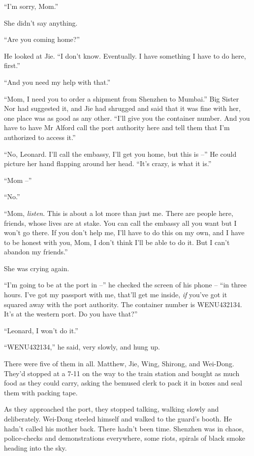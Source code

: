 ``I'm sorry, Mom.''

She didn't say anything.

``Are you coming home?''

He looked at Jie. ``I don't know. Eventually. I have something I
have to do here, first.''

``And you need my help with that.''

``Mom, I need you to order a shipment from Shenzhen to Mumbai.'' Big
Sister Nor had suggested it, and Jie had shrugged and said that it
was fine with her, one place was as good as any other. ``I'll give
you the container number. And you have to have Mr Alford call the
port authority here and tell them that I'm authorized to access
it.''

``No, Leonard. I'll call the embassy, I'll get you home, but this is
--'' He could picture her hand flapping around her head. ``It's
crazy, is what it is.''

``Mom --''

``No.''

``Mom, \emph{listen}. This is about a lot more than just me. There
are people here, friends, whose lives are at stake. You can call
the embassy all you want but I won't go there. If you don't help
me, I'll have to do this on my own, and I have to be honest with
you, Mom, I don't think I'll be able to do it. But I can't abandon
my friends.''

She was crying again.

``I'm going to be at the port in --'' he checked the screen of his
phone -- ``in three hours. I've got my passport with me, that'll get
me inside, \emph{if} you've got it squared away with the port
authority. The container number is WENU432134. It's at the western
port. Do you have that?''

``Leonard, I won't do it.''

``WENU432134,'' he said, very slowly, and hung up.

\tb

There were five of them in all. Matthew, Jie, Wing, Shirong, and
Wei-Dong. They'd stopped at a 7-11 on the way to the train station
and bought as much food as they could carry, asking the bemused
clerk to pack it in boxes and seal them with packing tape.

As they approached the port, they stopped talking, walking slowly
and deliberately. Wei-Dong steeled himself and walked to the
guard's booth. He hadn't called his mother back. There hadn't been
time. Shenzhen was in chaos, police-checks and demonstrations
everywhere, some riots, spirals of black smoke heading into the
sky.


